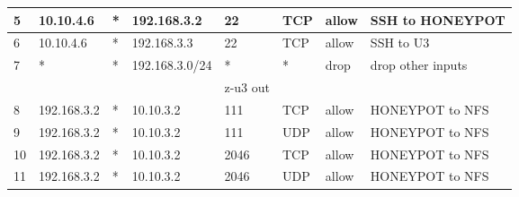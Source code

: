 \documentclass[a4paper, 11pt, oneside]{article}
\begin{document}
\begin{table}[H]
\begin{tabular}{|llllllll|}
  \multicolumn{1}{|l|}{5}           & \multicolumn{1}{l|}{10.10.4.6}       & \multicolumn{1}{l|}{*}           & \multicolumn{1}{l|}{192.168.3.2}          & \multicolumn{1}{l|}{22}          & \multicolumn{1}{l|}{TCP}               & \multicolumn{1}{l|}{allow}           & SSH to HONEYPOT     \\ \hline
  \multicolumn{1}{|l|}{6}           & \multicolumn{1}{l|}{10.10.4.6}       & \multicolumn{1}{l|}{*}           & \multicolumn{1}{l|}{192.168.3.3}          & \multicolumn{1}{l|}{22}          & \multicolumn{1}{l|}{TCP}               & \multicolumn{1}{l|}{allow}           & SSH to U3           \\ \hline
  \multicolumn{1}{|l|}{7}           & \multicolumn{1}{l|}{*}               & \multicolumn{1}{l|}{*}           & \multicolumn{1}{l|}{192.168.3.0/24}       & \multicolumn{1}{l|}{*}           & \multicolumn{1}{l|}{*}                 & \multicolumn{1}{l|}{drop}            & drop other inputs   \\ \hline
                                    &                                      &                                  &                                           & {\color[HTML]{FE0000} z-u3 out}  &                                        &                                      &                     \\ \hline
  \multicolumn{1}{|l|}{8}           & \multicolumn{1}{l|}{192.168.3.2}     & \multicolumn{1}{l|}{*}           & \multicolumn{1}{l|}{10.10.3.2}            & \multicolumn{1}{l|}{111}         & \multicolumn{1}{l|}{TCP}               & \multicolumn{1}{l|}{allow}           & HONEYPOT to NFS     \\ \hline
  \multicolumn{1}{|l|}{9}           & \multicolumn{1}{l|}{192.168.3.2}     & \multicolumn{1}{l|}{*}           & \multicolumn{1}{l|}{10.10.3.2}            & \multicolumn{1}{l|}{111}         & \multicolumn{1}{l|}{UDP}               & \multicolumn{1}{l|}{allow}           & HONEYPOT to NFS     \\ \hline
  \multicolumn{1}{|l|}{10}          & \multicolumn{1}{l|}{192.168.3.2}     & \multicolumn{1}{l|}{*}           & \multicolumn{1}{l|}{10.10.3.2}            & \multicolumn{1}{l|}{2046}        & \multicolumn{1}{l|}{TCP}               & \multicolumn{1}{l|}{allow}           & HONEYPOT to NFS     \\ \hline
  \multicolumn{1}{|l|}{11}          & \multicolumn{1}{l|}{192.168.3.2}     & \multicolumn{1}{l|}{*}           & \multicolumn{1}{l|}{10.10.3.2}            & \multicolumn{1}{l|}{2046}        & \multicolumn{1}{l|}{UDP}               & \multicolumn{1}{l|}{allow}           & HONEYPOT to NFS     \\ \hline

\end{tabular}
\end{table}
\end{document}
